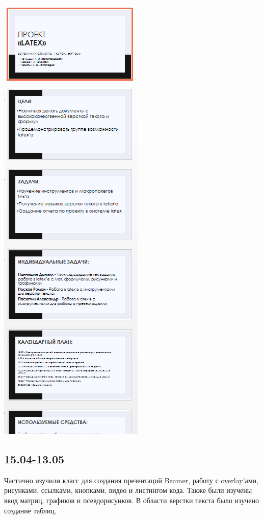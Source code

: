 \documentclass{article}
\begin{document}
	
	\includegraphics{8}
	
	
	
	\subsection*{15.04-13.05}
	
	Частично изучили класс для создания презентаций Beamer, работу с overlay’ами, рисунками, ссылками, кнопками, видео и листингом кода. Также были изучены ввод матриц, графиков и псевдорисунков. В области верстки текста было изучено создание таблиц.
	
\end{document}
